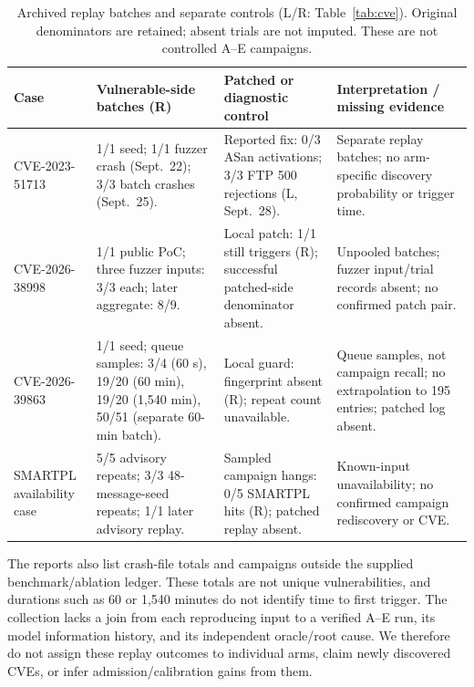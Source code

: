 \begin{table}[!tbp]
\centering\small
\caption{Archived replay batches and separate controls (L/R: Table~\ref{tab:cve}). Original denominators are retained; absent trials are not imputed. These are not controlled A--E campaigns.}
\label{tab:cveresults}
\begin{tabularx}{\textwidth}{@{}>{\raggedright\arraybackslash}p{} Y Y Y@{}}
\toprule
Case & Vulnerable-side batches (R) & Patched or diagnostic control & Interpretation / missing evidence \\
\midrule
\mbox{CVE-2023-51713} & 1/1 seed; 1/1 fuzzer crash (Sept.~22); 3/3 batch crashes (Sept.~25). & Reported fix: 0/3 ASan activations; 3/3 FTP 500 rejections (L, Sept.~28). & Separate replay batches; no arm-specific discovery probability or trigger time. \\
\addlinespace[3pt]
\mbox{CVE-2026-38998} & 1/1 public PoC; three fuzzer inputs: 3/3 each; later aggregate: 8/9. & Local patch: 1/1 still triggers (R); successful patched-side denominator absent. & Unpooled batches; fuzzer input/trial records absent; no confirmed patch pair. \\
\addlinespace[3pt]
\mbox{CVE-2026-39863} & 1/1 seed; queue samples: 3/4 (60 s), 19/20 (60 min), 19/20 (1,540 min), 50/51 (separate 60-min batch). & Local guard: fingerprint absent (R); repeat count unavailable. & Queue samples, not campaign recall; no extrapolation to 195 entries; patched log absent. \\
\addlinespace[3pt]
SMARTPL availability case & 5/5 advisory repeats; 3/3 48-message-seed repeats; 1/1 later advisory replay. & Sampled campaign hangs: 0/5 SMARTPL hits (R); patched replay absent. & Known-input unavailability; no confirmed campaign rediscovery or CVE. \\
\bottomrule
\end{tabularx}
\end{table}

The reports also list crash-file totals and campaigns outside the supplied benchmark/ablation ledger. These totals are not unique vulnerabilities, and durations such as 60 or 1,540 minutes do not identify time to first trigger. The collection lacks a join from each reproducing input to a verified A--E run, its model information history, and its independent oracle/root cause. We therefore do not assign these replay outcomes to individual arms, claim newly discovered CVEs, or infer admission/calibration gains from them.

